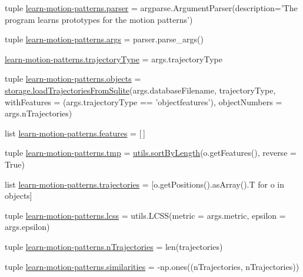 \begin{DoxyCompactItemize}
\item 
tuple \hyperlink{namespacelearn-motion-patterns_a2ee2575827c62e37bfd79aced1148c60}{learn-\/motion-\/patterns.\-parser} = argparse.\-Argument\-Parser(description='The program learns prototypes for the motion patterns')
\item 
tuple \hyperlink{namespacelearn-motion-patterns_a6123b7367cecd161c4b37d4e5ade6160}{learn-\/motion-\/patterns.\-args} = parser.\-parse\-\_\-args()
\item 
\hyperlink{namespacelearn-motion-patterns_ace4aade9e65ee501ddec0deb5f45a58c}{learn-\/motion-\/patterns.\-trajectory\-Type} = args.\-trajectory\-Type
\item 
tuple \hyperlink{namespacelearn-motion-patterns_a242ac9b9cb6e845d06e5e03fbfd36476}{learn-\/motion-\/patterns.\-objects} = \hyperlink{namespacestorage_aaafba9f6bc0816ff0084df5e1d892a9d}{storage.\-load\-Trajectories\-From\-Sqlite}(args.\-database\-Filename, trajectory\-Type, with\-Features = (args.\-trajectory\-Type == 'objectfeatures'), object\-Numbers = args.\-n\-Trajectories)
\item 
list \hyperlink{namespacelearn-motion-patterns_a1a839acfed418bb16ca2023be5596653}{learn-\/motion-\/patterns.\-features} = \mbox{[}$\,$\mbox{]}
\item 
tuple \hyperlink{namespacelearn-motion-patterns_ab1cf5c122059cea6e978c78bd1074946}{learn-\/motion-\/patterns.\-tmp} = \hyperlink{namespaceutils_a53b90e530e8f03a89dab67fd68c47952}{utils.\-sort\-By\-Length}(o.\-get\-Features(), reverse = True)
\item 
list \hyperlink{namespacelearn-motion-patterns_afdef69b14d29eacc7430f2fe94217352}{learn-\/motion-\/patterns.\-trajectories} = \mbox{[}o.\-get\-Positions().as\-Array().T for o in objects\mbox{]}
\item 
tuple \hyperlink{namespacelearn-motion-patterns_a555894845c9f5033522d85dda8b35b44}{learn-\/motion-\/patterns.\-lcss} = utils.\-L\-C\-S\-S(metric = args.\-metric, epsilon = args.\-epsilon)
\item 
tuple \hyperlink{namespacelearn-motion-patterns_a1fab655ce5b2a25a3dc5eb15a902bf6b}{learn-\/motion-\/patterns.\-n\-Trajectories} = len(trajectories)
\item 
tuple \hyperlink{namespacelearn-motion-patterns_ab858728c4958e5b8bdd23a4afaed49cc}{learn-\/motion-\/patterns.\-similarities} = -\/np.\-ones((n\-Trajectories, n\-Trajectories))
\end{DoxyCompactItemize}
